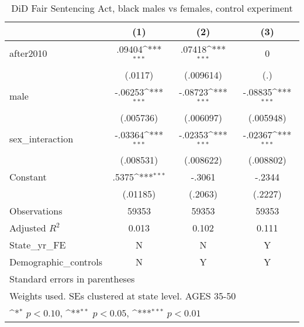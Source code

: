\begin{table}[htbp]\centering
\def\sym#1{\ifmmode^{#1}\else\(^{#1}\)\fi}
\caption{DiD Fair Sentencing Act, black males vs females, control experiment}
\begin{tabular}{l*{3}{c}}
\hline\hline
                    &\multicolumn{1}{c}{(1)}         &\multicolumn{1}{c}{(2)}         &\multicolumn{1}{c}{(3)}         \\
\hline
after2010           &      .09404\sym{***}&      .07418\sym{***}&           0         \\
                    &     (.0117)         &   (.009614)         &         (.)         \\
[1em]
male                &     -.06253\sym{***}&     -.08723\sym{***}&     -.08835\sym{***}\\
                    &   (.005736)         &   (.006097)         &   (.005948)         \\
[1em]
sex\_interaction     &     -.03364\sym{***}&     -.02353\sym{***}&     -.02367\sym{***}\\
                    &   (.008531)         &   (.008622)         &   (.008802)         \\
[1em]
Constant            &       .5375\sym{***}&      -.3061         &      -.2344         \\
                    &    (.01185)         &     (.2063)         &     (.2227)         \\
\hline
Observations        &       59353         &       59353         &       59353         \\
Adjusted \(R^{2}\)  &       0.013         &       0.102         &       0.111         \\
State\_yr\_FE         &           N         &           N         &           Y         \\
Demographic\_controls&           N         &           Y         &           Y         \\
\hline\hline
\multicolumn{4}{l}{\footnotesize Standard errors in parentheses}\\
\multicolumn{4}{l}{\footnotesize Weights used. SEs clustered at state level. AGES 35-50}\\
\multicolumn{4}{l}{\footnotesize \sym{*} \(p<0.10\), \sym{**} \(p<0.05\), \sym{***} \(p<0.01\)}\\
\end{tabular}
\end{table}
